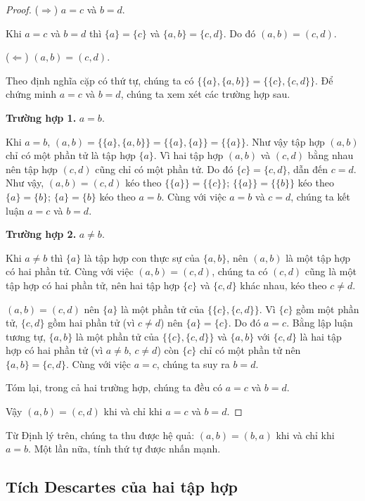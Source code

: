 \begin{proof}
    ($\Rightarrow$) $a = c$ và $b = d$.

    Khi $a = c$ và $b = d$ thì $\{ a \} = \{ c \}$ và $\{ a, b \} = \{ c, d \}$. Do đó $(a, b) = (c, d)$.

    ($\Leftarrow$) $(a, b) = (c, d)$.

    Theo định nghĩa cặp có thứ tự, chúng ta có $\{ \{ a \}, \{ a, b \} \} = \{ \{ c \}, \{ c, d \} \}$. Để chứng minh $a = c$ và $b = d$, chúng ta xem xét các trường hợp sau.

    \textbf{Trường hợp 1.} $a = b$.

    Khi $a = b$, $(a, b) = \{ \{ a \}, \{ a, b \} \} = \{ \{ a \}, \{ a \} \} = \{ \{ a \} \}$. Như vậy tập hợp $(a, b)$ chỉ có một phần tử là tập hợp $\{ a \}$. Vì hai tập hợp $(a, b)$ và $(c, d)$ bằng nhau nên tập hợp $(c, d)$ cũng chỉ có một phần tử. Do đó $\{ c \} = \{ c, d \}$, dẫn đến $c = d$. Như vậy, $(a, b) = (c, d)$ kéo theo $\{\{ a \}\} = \{\{ c \}\}$; $\{ \{ a \} \} = \{ \{ b \} \}$ kéo theo $\{ a \} = \{ b \}$; $\{ a \} = \{ b \}$ kéo theo $a = b$. Cùng với việc $a = b$ và $c = d$, chúng ta kết luận $a = c$ và $b = d$.

    \textbf{Trường hợp 2.} $a\ne b$.

    Khi $a\ne b$ thì $\{ a \}$ là tập hợp con thực sự của $\{ a, b \}$, nên $(a, b)$ là một tập hợp có hai phần tử. Cùng với việc $(a, b) = (c, d)$, chúng ta có $(c, d)$ cũng là một tập hợp có hai phần tử, nên hai tập hợp $\{ c \}$ và $\{ c, d \}$ khác nhau, kéo theo $c\ne d$.

    $(a, b) = (c, d)$ nên $\{ a \}$ là một phần tử của $\{ \{ c \}, \{ c, d \} \}$. Vì $\{ c \}$ gồm một phần tử, $\{ c, d \}$ gồm hai phần tử (vì $c\ne d$) nên $\{ a \} = \{ c \}$. Do đó $a = c$. Bằng lập luận tương tự, $\{ a, b \}$ là một phần tử của $\{ \{ c \}, \{ c, d \} \}$ và $\{ a, b \}$ với $\{ c, d \}$ là hai tập hợp có hai phần tử (vì $a\ne b$, $c\ne d$) còn $\{ c \}$ chỉ có một phần tử nên $\{ a, b \} = \{ c, d \}$. Cùng với việc $a = c$, chúng ta suy ra $b = d$.

    Tóm lại, trong cả hai trường hợp, chúng ta đều có $a = c$ và $b = d$.

    Vậy $(a, b) = (c, d)$ khi và chỉ khi $a = c$ và $b = d$.
\end{proof}

Từ Định lý trên, chúng ta thu được hệ quả: $(a, b) = (b, a)$ khi và chỉ khi $a = b$. Một lần nữa, tính thứ tự được nhấn mạnh.

\subsection{Tích Descartes của hai tập hợp}

